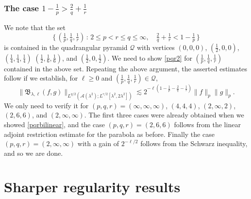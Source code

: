 \documentclass[11pt]{amsart}
\theoremstyle{definition}
\numberwithin{theorem}{section}
\numberwithin{definition}{section}
\numberwithin{equation}{section}
\newcommand{\Be}{\begin{equation}}
\newcommand{\Ee}{\end{equation}}
\renewcommand{\le}{\leqslant}
\renewcommand{\ge}{\geqslant}
\def\lc{\lesssim}
\def\la{\lambda}             \def\La{\Lambda}
\def\fB{{\mathfrak {B}}}
\def\cA{{\mathcal {A}}}
\renewcommand{\le}{\leqslant}
\renewcommand{\ge}{\geqslant}
\begin{document}
\subsubsection*{The case  $1-\frac 1p>
\frac 2q+\frac 1r$}
We note that the set
\[ \big\{\,(\tfrac1p, \tfrac1q,\tfrac1r)\,:\,  2\le p<r\le q\le \infty,\quad \tfrac 2q+\tfrac 1r < 1-\tfrac 1p\,\big\}\]
is contained in the  quadrangular pyramid $\mathcal Q$ with vertices $(0, 0, 0)$,  $(\frac12,0,0)$, $(\frac14, \frac14, \frac14)$
$(\frac12, \frac16,\frac16)$, and $(\frac12, 0,\frac12)$.  We need to show \eqref{pqr2} for $(\frac1p,\frac1q,\frac1r)$ contained in the above set. Repeating the above argument,  the asserted estimates follow if we establish,  for $\ell\ge 0$ and $(\frac1p,\frac1q,\frac1r)\in \mathcal Q$,
\Be%
\label{pqrbilsecond}
\|\fB_{\la,\ell} (f,g)\|_{L^{q/2}(\cA(\la^2); L^{r/2}[\la^2, 2\la^2])}
 \lc 2^{-\ell(1-\frac 1p -\frac 2q-\frac 1r)}
\|f\|_p \|g\|_p.
\Ee%
We only need to verify it for
 $(p,q,r)=(\infty, \infty, \infty)$,  $(4, 4, 4)$,  $(2, \infty,2)$,
$(2, 6,6)$, and $(2,\infty,\infty)$. The first three cases were
already obtained when we showed \eqref{pqrbilinear}, and the case
$(p,q,r)=(2, 6,6)$ follows from the linear adjoint restriction
estimate for the parabola as before. Finally the case
$(p,q,r)=(2,\infty,\infty)$ with a gain of $2^{-\ell/2}$ follows
from the Schwarz inequality, and so we are done.




\section{Sharper regularity results}\label{fifth}

\end{document}
